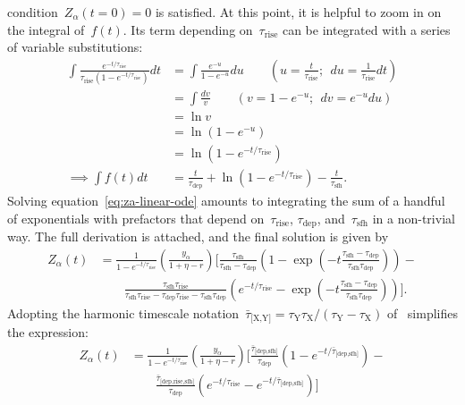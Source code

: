 \documentclass[12pt]{article}
\newcommand{\timescale}[1]{\ensuremath{\tau_\text{#1}}}
\newcommand{\harmonic}[2]{\ensuremath{\bar{\tau}_\text{[#1,#2]}}}
\newcommand{\hharmonic}[3]{\ensuremath{\bar{\tau}_\text{[#1,#2,#3]}}}
\begin{document}
condition~$Z_\alpha(t = 0) = 0$ is satisfied.
At this point, it is helpful to zoom in on the integral of~$f(t)$.
Its term depending on~$\timescale{rise}$ can be integrated with a series of
variable substitutions:
\begin{subequations}\begin{align}
\int \frac{
	e^{-t / \timescale{rise}}
}{
	\timescale{rise}(1 - e^{-t / \timescale{rise}})
} dt
&= \int \frac{e^{-u}}{1 - e^{-u}} du
\qquad \left(u = \frac{t}{\timescale{rise}};~~du = \frac{1}{\timescale{rise}}
dt\right)
\\
&= \int \frac{dv}{v} \qquad \left(v = 1 - e^{-u};~~dv = e^{-u} du\right)
\\
&= \ln v
\\
&= \ln (1 - e^{-u})
\\
&= \ln (1 - e^{-t / \timescale{rise}})
\\
\implies \int f(t) dt
&= \frac{t}{\timescale{dep}} + \ln (1 - e^{-t / \timescale{rise}}) -
\frac{t}{\timescale{sfh}}.
\end{align}\end{subequations}
Solving equation~\ref{eq:za-linear-ode} amounts to integrating the sum of a
handful of exponentials with prefactors that depend on~\timescale{rise},
\timescale{dep}, and~\timescale{sfh} in a non-trivial way.
The full derivation is attached, and the final solution is given by
\begin{equation}
\begin{split}
Z_\alpha(t) &= \frac{1}{1 - e^{-t / \timescale{rise}}}
\left(\frac{y_\alpha}{1 + \eta - r}\right)
\bigg[\frac{
	\timescale{sfh}
}{
	\timescale{sfh} - \timescale{dep}
} \left(
1 - \exp\left(-t\frac{
	\timescale{sfh} - \timescale{dep}
}{
	\timescale{sfh}\timescale{dep}
}\right)
\right) -
\\
&\qquad \frac{
	\timescale{sfh}\timescale{rise}
}{
	\timescale{sfh}\timescale{rise} - \timescale{dep}\timescale{rise} -
	\timescale{sfh}\timescale{dep}
} \left(e^{-t / \timescale{rise}} -
\exp\left(-t
\frac{
	\timescale{sfh} - \timescale{dep}
}{
	\timescale{sfh}\timescale{dep}
}
\right)
\right)\bigg].
\end{split}
\end{equation}
Adopting the harmonic timescale notation~$\harmonic{X}{Y} = \timescale{Y}
\timescale{X} / (\timescale{Y} - \timescale{X})$ of~\citet*{Weinberg2017}
simplifies the expression:
\begin{equation}
\begin{split}
Z_\alpha(t) &= \frac{1}{1 - e^{-t / \timescale{rise}}} \left( \frac{
	y_\alpha
}{
	1 + \eta - r
}\right) \bigg[
\frac{\harmonic{dep}{sfh}}{\timescale{dep}}
\left(1 - e^{-t / \harmonic{dep}{sfh}}\right) -
\\
&\qquad \frac{\hharmonic{dep}{rise}{sfh}}{\timescale{dep}}
\left(e^{-t / \timescale{rise}} - e^{-t / \harmonic{dep}{sfh}}\right)
\bigg]
\end{split}
\label{eq:zalpha}
\end{equation}
\end{document}
